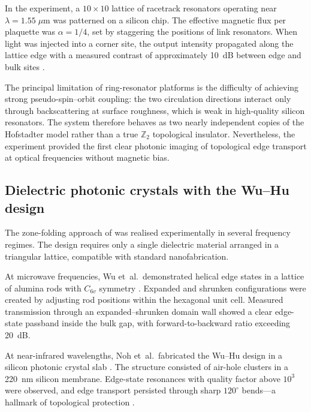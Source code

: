 In the experiment, a $10\times 10$ lattice of racetrack resonators
operating near $\lambda=1.55\;\mu\mathrm{m}$ was patterned on a
silicon chip.  The effective magnetic flux per plaquette was
$\alpha=1/4$, set by staggering the positions of link resonators.
When light was injected into a corner site, the output intensity
propagated along the lattice edge with a measured contrast of
approximately 10~dB between edge and bulk sites
\cite{hafezi2013imaging,ozawa2018topological}.

The principal limitation of ring-resonator platforms is the difficulty
of achieving strong pseudo-spin--orbit coupling: the two circulation
directions interact only through backscattering at surface
roughness, which is weak in high-quality silicon resonators.  The
system therefore behaves as two nearly independent copies of the
Hofstadter model rather than a true $\mathbb{Z}_2$ topological
insulator.  Nevertheless, the experiment provided the first clear
photonic imaging of topological edge transport at optical
frequencies without magnetic bias.

\subsection{Dielectric photonic crystals with the Wu--Hu design}
\label{sec:ch11-wu-hu-exp}

The zone-folding approach of  was realised
experimentally in several frequency regimes.  The design requires
only a single dielectric material arranged in a triangular lattice,
compatible with standard nanofabrication.

At microwave frequencies, Wu et~al.\ demonstrated helical edge states
in a lattice of alumina rods with $C_{6v}$ symmetry
\cite{wu2017direct}.  Expanded and shrunken configurations were
created by adjusting rod positions within the hexagonal unit cell.
Measured transmission through an expanded--shrunken domain wall
showed a clear edge-state passband inside the bulk gap, with
forward-to-backward ratio exceeding 20~dB.

At near-infrared wavelengths, Noh et~al.\ fabricated the Wu--Hu
design in a silicon photonic crystal slab
\cite{noh2018observation}.  The structure consisted of air-hole
clusters in a 220~nm silicon membrane.  Edge-state resonances with
quality factor above $10^3$ were observed, and edge transport
persisted through sharp $120^\circ$ bends---a hallmark of
topological protection \cite{ozawa2018topological}.

